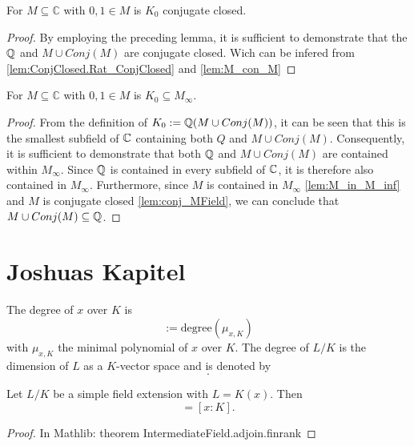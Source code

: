 \begin{corollary}
    \label{cor:K_zero_conjectClosed}
    \leanok
    For $M\subseteq \mathbb{C}$ with $0,1 \in M$ is $K_0$ conjugate closed.
\end{corollary}
\begin{proof}
    By employing the preceding lemma, it is sufficient to demonstrate that the $\mathbb{Q}$ and $M \cup Conj(M)$ are conjugate closed. 
    Wich can be infered from \ref{lem:ConjClosed.Rat_ConjClosed} and \ref{lem:M_con_M}
\end{proof}

\begin{lemma}
    \label{lem:K_zero_in_MField}
    \leanok
    For $M\subseteq \mathbb{C}$ with $0,1 \in M$ is $K_0 \subseteq M_{\infty}$.
\end{lemma}
\begin{proof}
From the definition of $K_0 := \mathbb{Q}(M\cup Conj(M))$, 
it can be seen that this is the smallest subfield of $\mathbb{C}$ containing both $Q$ and $M\cup Conj(M)$. 
Consequently, it is sufficient to demonstrate that both $\mathbb{Q}$ and $M\cup Conj(M)$ are contained within $M_{\infty}$. 
Since $\mathbb{Q}$ is contained in every subfield of $\mathbb{C}$, it is therefore also contained in $M_{\infty}$. 
Furthermore, since $M$ is contained in $M_{\infty}$ \ref{lem:M_in_M_inf} and $M$ is conjugate closed \ref{lem:conj_MField}, we can conclude that $M\cup Conj(M) \subseteq \mathbb{Q}$.
\end{proof}


\section{Joshuas Kapitel}

\begin{definition}
    The degree of $x$ over $K$ is
    \begin{equation*}
        [x:K] :=\text{degree}(\mu_{x,K})
        \end{equation*}
        with $\mu_{x,K}$ the minimal polynomial of $x$ over $K$. \newline
    The degree of $L/K$ is the dimension of $L$ as a $K$-vector space and is denoted by
    \begin{equation*}
        [L:K].
    \end{equation*}
\end{definition}

\begin{theorem}
\label{thm:degree_of_simple_field_extension}
    Let $L/K$ be a simple field extension with $L = K(x)$. Then
    \begin{equation*}
        [L:K] = [x:K].
    \end{equation*}
\end{theorem}
\begin{proof}
    In Mathlib: theorem IntermediateField.adjoin.finrank
\end{proof}

